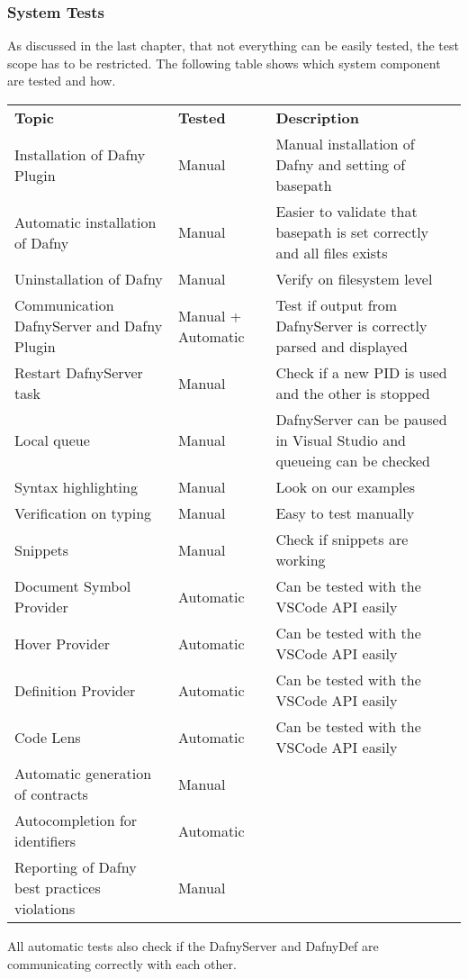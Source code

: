 \subsubsection{System Tests}
As discussed in the last chapter, that not everything can be easily tested, the test scope has to be restricted. The following table shows which system component are tested and how.
\begin{longtable}{ p{} | p{} | p{} }
\textbf{Topic} & \textbf{Tested} & \textbf{Description}\\
	Installation of Dafny Plugin & Manual & Manual installation of Dafny and setting of basepath   \\
	Automatic installation of Dafny & Manual & Easier to validate that basepath is set correctly and all files exists \\
	Uninstallation of Dafny & Manual & Verify on filesystem level\\
	Communication DafnyServer and Dafny Plugin & Manual + Automatic & Test if output from DafnyServer is correctly parsed and displayed\\
	Restart DafnyServer task & Manual & Check if a new PID is used and the other is stopped\\
	Local queue & Manual & DafnyServer can be paused in Visual Studio and queueing can be checked \\
	Syntax highlighting & Manual & Look on our examples \\
	Verification on typing & Manual & Easy to test manually\\
	Snippets & Manual & Check if snippets are working\\
	Document Symbol Provider & Automatic & Can be tested with the VSCode API easily \\
	Hover Provider & Automatic & Can be tested with the VSCode API easily \\
	Definition Provider & Automatic & Can be tested with the VSCode API easily  \\
	Code Lens & Automatic & Can be tested with the VSCode API easily \\
	Automatic generation of contracts & Manual & \todo{add desc} \\
	Autocompletion for identifiers & Automatic & \todo{add desc} \\
	Reporting of Dafny best practices violations & Manual & \todo{add desc} \\
\end{longtable}
All automatic tests also check if the DafnyServer and DafnyDef are communicating correctly with each other.


